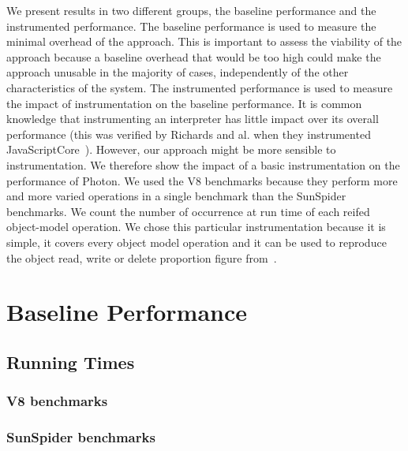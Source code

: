 We present results in two different groups, the baseline performance and the
instrumented performance.  The baseline performance is used to measure the
minimal overhead of the approach.  This is important to assess the viability of
the approach because a baseline overhead that would be too high could make the
approach unusable in the majority of cases, independently of the other
characteristics of the system. The instrumented performance is used to measure
the impact of instrumentation on the baseline performance. It is common
knowledge that instrumenting an interpreter has little impact over its overall
performance (this was verified by Richards and al. when they instrumented
JavaScriptCore~\cite{behavior_js}). However, our approach might be more
sensible to instrumentation. We therefore show the impact of a basic
instrumentation on the performance of Photon. We used the V8 benchmarks because
they perform more and more varied operations in a single benchmark than the
SunSpider benchmarks. We count the number of occurrence at run time of each
reifed object-model operation. We chose this particular instrumentation because
it is simple, it covers every object model operation and it can be used to
reproduce the object read, write or delete proportion figure
from~\cite{behavior_js}.


\section{Baseline Performance}

\subsection{Running Times}

\subsubsection{V8 benchmarks}



\subsubsection{SunSpider benchmarks}



